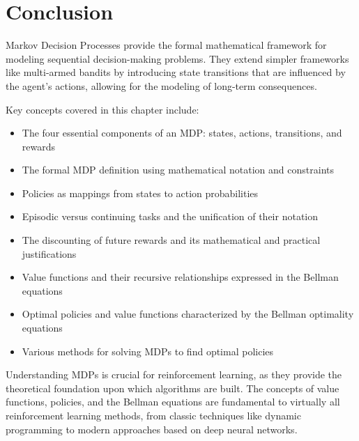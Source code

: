 \documentclass[12pt,a4paper]{article}
\begin{document}
\section{Conclusion}

Markov Decision Processes provide the formal mathematical framework for modeling sequential decision-making problems. They extend simpler frameworks like multi-armed bandits by introducing state transitions that are influenced by the agent's actions, allowing for the modeling of long-term consequences.

Key concepts covered in this chapter include:

\begin{itemize}
    \item The four essential components of an MDP: states, actions, transitions, and rewards
    \item The formal MDP definition using mathematical notation and constraints
    \item Policies as mappings from states to action probabilities
    \item Episodic versus continuing tasks and the unification of their notation
    \item The discounting of future rewards and its mathematical and practical justifications
    \item Value functions and their recursive relationships expressed in the Bellman equations
    \item Optimal policies and value functions characterized by the Bellman optimality equations
    \item Various methods for solving MDPs to find optimal policies
\end{itemize}

Understanding MDPs is crucial for reinforcement learning, as they provide the theoretical foundation upon which algorithms are built. The concepts of value functions, policies, and the Bellman equations are fundamental to virtually all reinforcement learning methods, from classic techniques like dynamic programming to modern approaches based on deep neural networks.
\end{document}
